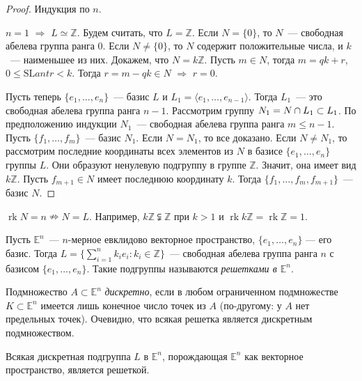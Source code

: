 \documentclass[a4paper]{article}
\renewcommand{\rk}{\mathop{\mathrm{rk}}\nolimits}
\newcommand*{\p}[1]{#1\nobreak\discretionary{}{\hbox{$\mathsurround=0pt #1$}}{}}
\begin{document}
\begin{proof}
Индукция по $n$.

$n=1$ $\Rightarrow$ $L\simeq\mathbb{Z}$. Будем считать, что
$L=\mathbb{Z}$. Если $N=\{0\}$, то $N$~--- свободная абелева группа
ранга 0. Если $N\neq\{0\}$, то $N$ содержит положительные числа, и
$k$~--- наименьшее из них. Докажем, что $N=k\mathbb{Z}$. Пусть $m\in
N$, тогда $m=qk+r$, $0\leq\mathrm{SL}ant r<k$. Тогда $r=m-qk\in N$
$\Rightarrow$ $r=0$.

Пусть теперь $\{e_1,\ldots,e_n\}$~--- базис $L$ и $L_1=\langle
e_1,\ldots,e_{n-1}\rangle$. Тогда $L_1$~--- это свободная абелева
группа ранга $n-1$. Рассмотрим группу $N_1\p=N\p\cap L_1\subset
L_1$. По предположению индукции $N_1$~--- свободная абелева группа
ранга $m\leqslant n-1$. Пусть $\{f_1,\ldots,f_m\}$~--- базис $N_1$.
Если $N=N_1$, то все доказано. Если $N\neq N_1$, то рассмотрим
последние координаты всех элементов из $N$ в базисе
$\{e_1,\ldots,e_n\}$ группы $L$. Они образуют ненулевую подгруппу в
группе $\mathbb{Z}$. Значит, она имеет вид $k\mathbb{Z}$. Пусть
$f_{m+1}\in N$ имеет последнюю координату $k$. Тогда
$\{f_1,\ldots,f_m,f_{m+1}\}$~--- базис $N$.
\end{proof}

\begin{note}
$\rk N=n\nRightarrow N=L$. Например, $k\mathbb{Z}\subsetneqq
\mathbb{Z}$ при $k>1$ и $\rk k\mathbb{Z}=\rk\mathbb{Z}=1$.
\end{note}

Пусть $\mathbb{E}^n$~--- $n$-мерное евклидово векторное
пространство, $\{e_1,\ldots,e_n\}$ --- его базис. Тогда
$L=\Big\{\sum\limits_{i=1}^n k_ie_i: k_i\in\mathbb{Z}\Big\}$~---
свободная абелева группа ранга $n$ с базисом $\{e_1,\ldots,e_n\}$.
Такие подгруппы называются \emph{решетками в $\mathbb{E}^n$}.

Подмножество $A\subset\mathbb{E}^n$ \emph{дискретно}, если в любом
ограниченном подмножестве $K\subset\mathbb{E}^n$ имеется лишь
конечное число точек из $A$ (по-другому: у $A$ нет предельных
точек). Очевидно, что всякая решетка является дискретным
подмножеством.

\begin{theorem}
\label{2.IV}Всякая дискретная подгруппа $L$ в $\mathbb{E}^n$,
порождающая $\mathbb{E}^n$ как векторное пространство, является
решеткой.
\end{theorem}
\end{document}
